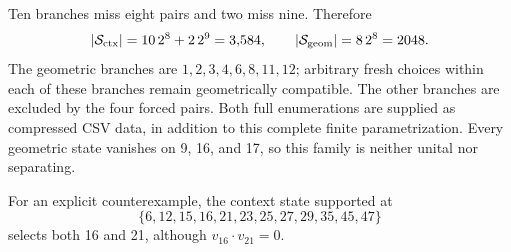 \documentclass[aps,pra,reprint,superscriptaddress,longbibliography,nofootinbib,floatfix,10pt]{revtex4-2}
\theoremstyle{definition}
\begin{document}
\endgroup
Ten branches miss eight pairs and two miss nine. Therefore
\begin{equation}\label{eq:cabello45-state-counts}
|\mathcal S_{\rm ctx}|=10\,2^8+2\,2^9=3{,}584,\qquad
|\mathcal S_{\rm geom}|=8\,2^8=2048.
\end{equation}
The geometric branches are $1,2,3,4,6,8,11,12$; arbitrary fresh
choices within each of these branches remain geometrically compatible.
The other branches are excluded by the four forced pairs. Both full
enumerations are supplied as compressed CSV data, in addition to this
complete finite parametrization. Every geometric state vanishes on
9, 16, and 17, so this family is neither unital nor separating.

For an explicit counterexample, the context state supported at
\[
\{6,12,15,16,21,23,25,27,29,35,45,47\}
\]
selects both 16 and 21, although $v_{16}\cdot v_{21}=0$.
\end{document}
